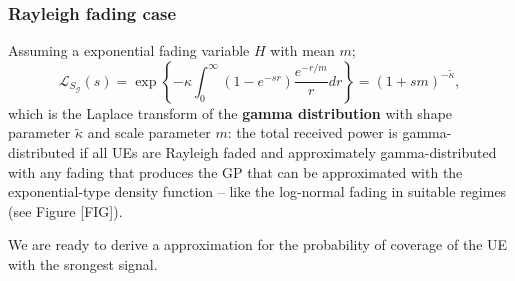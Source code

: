 \documentclass[conference]{IEEEtran}
\theoremstyle{definition}
\theoremstyle{plain}
\begin{document}
          \subsubsection{Rayleigh fading case}
          Assuming a exponential fading variable $H$ with mean $m$;
          \begin{equation}
            \label{eq:lapexp}
            \mathcal{L}_{S_{\mathcal{G}}}(s)= \exp\left\{-\mathcal{\kappa}\int_0^{\infty}(1-e^{-sr})\frac{e^{-r/m}}{r} dr \right\}=(1+sm)^{-\tilde{\kappa}},
          \end{equation}
          which is the Laplace transform of the \textbf{gamma distribution} with shape parameter $\tilde{\kappa}$ and scale parameter $m$: the total received power is gamma-distributed if all UEs are Rayleigh faded and approximately gamma-distributed with any fading that produces the GP that can be approximated with the exponential-type density function – like the log-normal fading in suitable regimes (see Figure [FIG]).
          
          
          We are ready to derive a approximation for the probability of coverage of the UE with the srongest signal.
\end{document}
